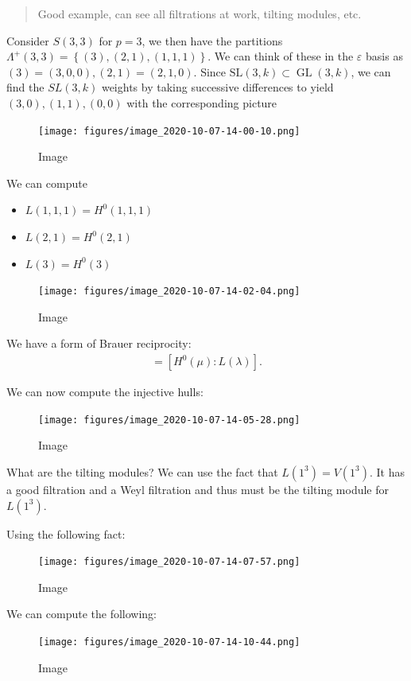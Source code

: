 \begin{example}

\begin{example}

\begin{quote}
Good example, can see all filtrations at work, tilting modules, etc.
\end{quote}

Consider \(S(3, 3)\) for \(p=3\), we then have the partitions
\(\Lambda^+(3, 3) = \left\{{(3), (2, 1), (1,1,1)}\right\}\). We can
think of these in the \(\varepsilon\) basis as
\((3) = (3,0,0), (2,1) = (2,1,0)\). Since
\({\text{SL}}(3, k) \subset \operatorname{GL}(3, k)\), we can find the
\(SL(3, k)\) weights by taking successive differences to yield
\((3, 0), (1, 1), (0, 0)\) with the corresponding picture

\begin{figure}
\centering
\texttt{[image: figures/image\_2020-10-07-14-00-10.png]}
\caption{Image}
\end{figure}

We can compute

\begin{itemize}
\tightlist
\item
  \(L(1,1,1) = H^0(1,1,1)\)
\item
  \(L(2, 1) = H^0(2, 1)\)
\item
  \(L(3) = H^0(3)\)
\end{itemize}

\begin{figure}
\centering
\texttt{[image: figures/image\_2020-10-07-14-02-04.png]}
\caption{Image}
\end{figure}

We have a form of Brauer reciprocity:
\begin{align*}   [I(\lambda): H^0(\mu)] = [H^0(\mu) : L(\lambda) ]  .\end{align*}

We can now compute the injective hulls:

\begin{figure}
\centering
\texttt{[image: figures/image\_2020-10-07-14-05-28.png]}
\caption{Image}
\end{figure}

What are the tilting modules? We can use the fact that
\(L(1^3) = V(1^3)\). It has a good filtration and a Weyl filtration and
thus must be the tilting module for \(L(1^3)\).

Using the following fact:

\begin{figure}
\centering
\texttt{[image: figures/image\_2020-10-07-14-07-57.png]}
\caption{Image}
\end{figure}

We can compute the following:

\begin{figure}
\centering
\texttt{[image: figures/image\_2020-10-07-14-10-44.png]}
\caption{Image}
\end{figure}

\end{example}

\end{example}

